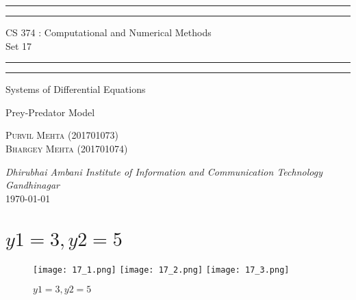 \documentclass{article}
\begin{document}
\begin{titlepage}
	\centering 
	\scshape
	\vspace*{\baselineskip}
	\rule{\textwidth}{1.6pt}\vspace*{-\baselineskip}\vspace*{2pt}
	\rule{\textwidth}{0.4pt} 
	\vspace{0.75\baselineskip}
	
	{\Large CS 374 : Computational and Numerical Methods \\\vspace{0.75\baselineskip} Set 17}
	\vspace{0.75\baselineskip}
	
	\rule{\textwidth}{0.4pt}\vspace*{-\baselineskip}\vspace{3.2pt} 
	\rule{\textwidth}{1.6pt}
	
	\vspace{2\baselineskip}  
	Systems of Differential Equations
	
	\vspace*{1\baselineskip}
	Prey-Predator Model
	
	\vspace{5\baselineskip} %
	
	{\scshape\large Purvil Mehta (201701073) \\ Bhargey Mehta (201701074) \\} 
	
	\vspace{1\baselineskip} 
	
	\textit{Dhirubhai Ambani Institute of Information and Communication Technology \\ Gandhinagar\\} 
	\vspace*{2\baselineskip}
	\today


\end{titlepage}

\tableofcontents

\newpage

\section{$y1 = 3, y2 = 5$}
\begin{figure}[!h]
    \centering
    \texttt{[image: 17\_1.png]}
    \texttt{[image: 17\_2.png]}
    \texttt{[image: 17\_3.png]}
    \caption{$y1 = 3, y2 = 5$}
\end{figure}
\end{document}

